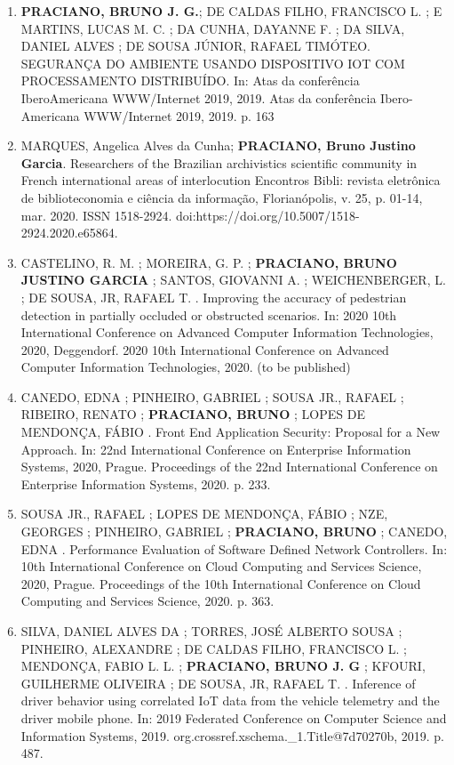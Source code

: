 \begin{enumerate}

\item \textbf{PRACIANO, BRUNO J. G.}; DE CALDAS FILHO, FRANCISCO L. ; E MARTINS, LUCAS M. C. ; DA CUNHA, DAYANNE F. ; DA SILVA, DANIEL ALVES ; DE SOUSA JÚNIOR, RAFAEL TIMÓTEO. SEGURANÇA DO AMBIENTE USANDO DISPOSITIVO IOT COM PROCESSAMENTO DISTRIBUÍDO. In: Atas da conferência IberoAmericana WWW/Internet 2019, 2019. Atas da conferência Ibero-Americana WWW/Internet 2019, 2019. p. 163

\item MARQUES, Angelica Alves da Cunha; \textbf{PRACIANO, Bruno Justino Garcia}. Researchers of the Brazilian archivistics scientific community in French international areas of interlocution Encontros Bibli: revista eletrônica de biblioteconomia e ciência da informação, Florianópolis, v. 25, p. 01-14, mar. 2020. ISSN 1518-2924. doi:https://doi.org/10.5007/1518-2924.2020.e65864.

\item CASTELINO, R. M. ; MOREIRA, G. P. ; \textbf{PRACIANO, BRUNO JUSTINO GARCIA} ; SANTOS, GIOVANNI A. ; WEICHENBERGER, L. ; DE SOUSA, JR, RAFAEL T. . Improving the accuracy of pedestrian detection in partially occluded or obstructed scenarios. In: 2020 10th International Conference on Advanced Computer Information Technologies, 2020, Deggendorf. 2020 10th International Conference on Advanced Computer Information Technologies, 2020. (to be published)

\item CANEDO, EDNA ; PINHEIRO, GABRIEL ; SOUSA JR., RAFAEL ; RIBEIRO, RENATO ; \textbf{PRACIANO, BRUNO} ; LOPES DE MENDONÇA, FÁBIO . Front End Application Security: Proposal for a New Approach. In: 22nd International Conference on Enterprise Information Systems, 2020, Prague. Proceedings of the 22nd International Conference on Enterprise Information Systems, 2020. p. 233.

\item SOUSA JR., RAFAEL ; LOPES DE MENDONÇA, FÁBIO ; NZE, GEORGES ; PINHEIRO, GABRIEL ; \textbf{PRACIANO, BRUNO }; CANEDO, EDNA . Performance Evaluation of Software Defined Network Controllers. In: 10th International Conference on Cloud Computing and Services Science, 2020, Prague. Proceedings of the 10th International Conference on Cloud Computing and Services Science, 2020. p. 363.


\item SILVA, DANIEL ALVES DA ; TORRES, JOSÉ ALBERTO SOUSA ; PINHEIRO, ALEXANDRE ; DE CALDAS FILHO, FRANCISCO L. ; MENDONÇA, FABIO L. L. ; \textbf{PRACIANO, BRUNO J. G} ; KFOURI, GUILHERME OLIVEIRA ; DE SOUSA, JR, RAFAEL T. . Inference of driver behavior using correlated IoT data from the vehicle telemetry and the driver mobile phone. In: 2019 Federated Conference on Computer Science and Information Systems, 2019. org.crossref.xschema.\_1.Title@7d70270b, 2019. p. 487.


\end{enumerate}
